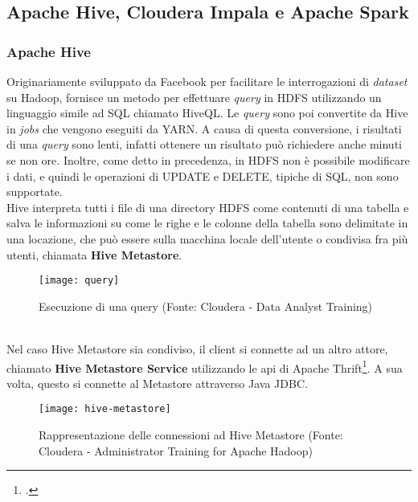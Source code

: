 \subsection{Apache Hive, Cloudera Impala e Apache Spark}
\subsubsection{Apache Hive}
Originariamente sviluppato da Facebook per facilitare le interrogazioni di \textit{dataset} su Hadoop, fornisce un metodo per effettuare \textit{query} in HDFS utilizzando un linguaggio simile ad SQL chiamato HiveQL. 
Le \textit{query} sono poi convertite da Hive in \textit{jobs} che vengono eseguiti da YARN. A causa di questa conversione, i risultati di una \textit{query} sono lenti, infatti ottenere un risultato può richiedere anche minuti se non ore. Inoltre, come detto in precedenza, in HDFS non è possibile modificare i dati, e quindi le operazioni di UPDATE e DELETE, tipiche di SQL, non sono supportate.\\
Hive interpreta tutti i file di una directory HDFS come contenuti di una tabella e salva le informazioni su come le righe e le colonne della tabella sono delimitate in una locazione, che può essere sulla macchina locale dell'utente o condivisa fra più utenti, chiamata \textbf{Hive Metastore}.
\begin{figure}[!h]
	\centering
	\texttt{[image: query]}
	\caption{Esecuzione di una query (Fonte: Cloudera - Data Analyst Training)}
\end{figure}
\\Nel caso Hive Metastore sia condiviso, il client si connette ad un altro attore, chiamato \textbf{Hive Metastore Service} utilizzando le \gls{api} di Apache Thrift\footcite{https://thrift.apache.org/}. A sua volta, questo si connette al Metastore attraverso \gls{Java JDBC}.
\begin{figure}[!h]
	\centering
	\texttt{[image: hive-metastore]}
	\caption{Rappresentazione delle connessioni ad Hive Metastore (Fonte: Cloudera - Administrator Training for Apache Hadoop)}
\end{figure}

